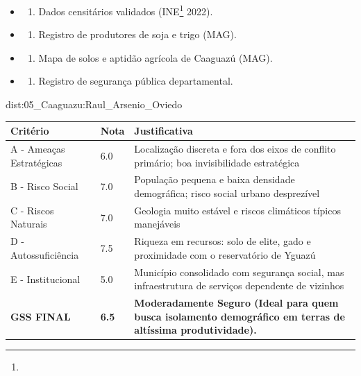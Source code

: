 {\begin{itemize}
\tightlist
\item
  \begin{enumerate}
  \def\labelenumi{\arabic{enumi})}
  \tightlist
  \item
    Dados censitários validados (INE\footnote{\fineINE} 2022).
  \end{enumerate}
\item
  \begin{enumerate}
  \def\labelenumi{\arabic{enumi})}
  \setcounter{enumi}{1}
  \tightlist
  \item
    Registro de produtores de soja e trigo (MAG).
  \end{enumerate}
\item
  \begin{enumerate}
  \def\labelenumi{\arabic{enumi})}
  \setcounter{enumi}{2}
  \tightlist
  \item
    Mapa de solos e aptidão agrícola de Caaguazú (MAG).
  \end{enumerate}
\item
  \begin{enumerate}
  \def\labelenumi{\arabic{enumi})}
  \setcounter{enumi}{3}
  \tightlist
  \item
    Registro de segurança pública departamental.
  \end{enumerate}
\end{itemize}}{dist:05_Caaguazu:Raul_Arsenio_Oviedo}
\begin{table}[ht!]
\small \begin{tabular}{p{3.0cm}p{0.8cm}p{6.0cm}} \toprule
\textbf{Critério} & \textbf{Nota} & \textbf{Justificativa} \\ \midrule
A - Ameaças Estratégicas & 6.0 & Localização discreta e fora dos eixos de conflito primário; boa invisibilidade estratégica \\
B - Risco Social & 7.0 & População pequena e baixa densidade demográfica; risco social urbano desprezível \\
C - Riscos Naturais & 7.0 & Geologia muito estável e riscos climáticos típicos manejáveis \\
D - Autossuficiência & 7.5 & Riqueza em recursos: solo de elite, gado e proximidade com o reservatório de Yguazú \\
E - Institucional & 5.0 & Município consolidado com segurança social, mas infraestrutura de serviços dependente de vizinhos \\
\midrule \textbf{GSS FINAL} & \textbf{6.5} & \textbf{Moderadamente Seguro (Ideal para quem busca isolamento demográfico em terras de altíssima produtividade).} \\ \bottomrule \end{tabular}
\end{table}
